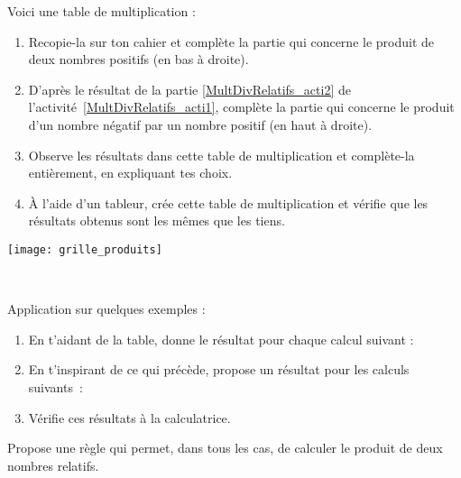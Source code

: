 \begin{activite}

\begin{minipage}[c]{0.66\linewidth}
\begin{partie}
Voici une table de multiplication :
\begin{enumerate}
 \item Recopie-la sur ton cahier et complète la partie qui concerne le produit de deux nombres positifs (en bas à droite).
 \item D'après le résultat de la partie \ref{MultDivRelatifs_acti2} de l'activité \ref{MultDivRelatifs_acti1}, complète la partie qui concerne le produit d'un nombre négatif par un nombre positif (en haut à droite).
 \item Observe les résultats dans cette table de multiplication et complète-la entièrement, en expliquant tes choix.
 \item À l'aide d'un tableur, crée cette table de multiplication et vérifie que les résultats obtenus sont les mêmes que les tiens.
 \end{enumerate}
\end{partie}
\end{minipage} \hfill%
 \begin{minipage}[c]{0.3\linewidth}
  \texttt{[image: grille\_produits]}
  \end{minipage} \\

\begin{partie}
Application sur quelques exemples :
\begin{enumerate}
 \item En t'aidant de la table, donne le résultat pour chaque calcul suivant :
 \item En t'inspirant de ce qui précède, propose un résultat pour les calculs suivants :
 \item Vérifie ces résultats à la calculatrice.
 \end{enumerate}
\end{partie}

\begin{partie}
Propose une règle qui permet, dans tous les cas, de calculer le produit de deux nombres relatifs.
\end{partie}

\end{activite}

